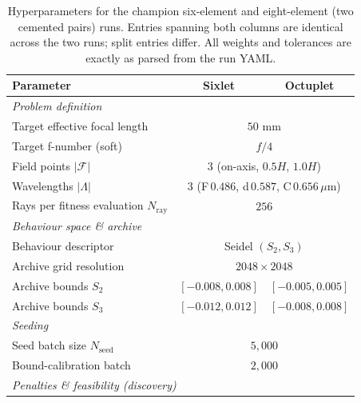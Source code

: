 \begin{table}[h]
\centering
\caption{Hyperparameters for the champion six-element and eight-element
(two cemented pairs) runs. Entries spanning both columns are identical across
the two runs; split entries differ. All weights and tolerances are exactly as
parsed from the run YAML.}
\label{tab:supp-hyperparams}
\begin{tabular}{lcc}
\toprule
Parameter & Sixlet & Octuplet \\
\midrule
\multicolumn{3}{l}{\emph{Problem definition}} \\
Target effective focal length        & \multicolumn{2}{c}{$50$ mm} \\
Target f-number (soft)               & \multicolumn{2}{c}{$f/4$} \\
Field points $|\mathcal{F}|$         & \multicolumn{2}{c}{$3$ (on-axis, $0.5H$, $1.0H$)} \\
Wavelengths $|\Lambda|$              & \multicolumn{2}{c}{$3$ (F\,$0.486$, d\,$0.587$, C\,$0.656$\,$\mu$m)} \\
Rays per fitness evaluation $N_{\mathrm{ray}}$ & \multicolumn{2}{c}{$256$} \\
\midrule
\multicolumn{3}{l}{\emph{Behaviour space \& archive}} \\
Behaviour descriptor                 & \multicolumn{2}{c}{Seidel $(S_2, S_3)$} \\
Archive grid resolution              & \multicolumn{2}{c}{$2048 \times 2048$} \\
Archive bounds $S_2$                 & $[-0.008, 0.008]$ & $[-0.005, 0.005]$ \\
Archive bounds $S_3$                 & $[-0.012, 0.012]$ & $[-0.008, 0.008]$ \\
\midrule
\multicolumn{3}{l}{\emph{Seeding}} \\
Seed batch size $N_{\mathrm{seed}}$  & \multicolumn{2}{c}{$5{,}000$} \\
Bound-calibration batch              & \multicolumn{2}{c}{$2{,}000$} \\
\midrule
\multicolumn{3}{l}{\emph{Penalties \& feasibility (discovery)}} \\

\end{tabular}
\end{table}
